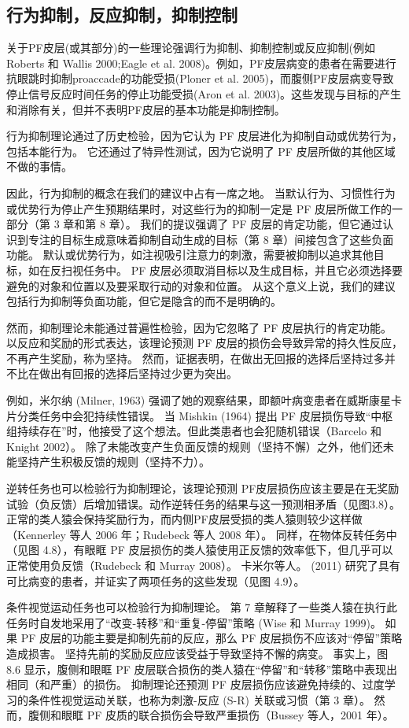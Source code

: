 \subsection{行为抑制，反应抑制，抑制控制}
关于PF皮层(或其部分)的一些理论强调行为抑制、抑制控制或反应抑制(例如Roberts 和 Wallis 2000;Eagle et al. 2008)。例如，PF皮层病变的患者在需要进行抗眼跳时抑制proaccade的功能受损(Ploner et al. 2005)，而腹侧PF皮层病变导致停止信号反应时间任务的停止功能受损(Aron et al. 2003)。这些发现与目标的产生和消除有关，但并不表明PF皮层的基本功能是抑制控制。
\par 
行为抑制理论通过了历史检验，因为它认为 PF 皮层进化为抑制自动或优势行为，包括本能行为。 它还通过了特异性测试，因为它说明了 PF 皮层所做的其他区域不做的事情。
\par 
因此，行为抑制的概念在我们的建议中占有一席之地。 当默认行为、习惯性行为或优势行为停止产生预期结果时，对这些行为的抑制一定是 PF 皮层所做工作的一部分（第 3 章和第 8 章）。 我们的提议强调了 PF 皮层的肯定功能，但它通过认识到专注的目标生成意味着抑制自动生成的目标（第 8 章）间接包含了这些负面功能。 默认或优势行为，如注视吸引注意力的刺激，需要被抑制以追求其他目标，如在反扫视任务中。 PF 皮层必须取消目标以及生成目标，并且它必须选择要避免的对象和位置以及要采取行动的对象和位置。 从这个意义上说，我们的建议包括行为抑制等负面功能，但它是隐含的而不是明确的。
\par 
然而，抑制理论未能通过普遍性检验，因为它忽略了 PF 皮层执行的肯定功能。 以反应和奖励的形式表达，该理论预测 PF 皮层的损伤会导致异常的持久性反应，不再产生奖励，称为坚持。 然而，证据表明，在做出无回报的选择后坚持过多并不比在做出有回报的选择后坚持过少更为突出。
\par 
例如，米尔纳 (Milner, 1963) 强调了她的观察结果，即额叶病变患者在威斯康星卡片分类任务中会犯持续性错误。 当 Mishkin (1964) 提出 PF 皮层损伤导致“中枢组持续存在”时，他接受了这个想法。但此类患者也会犯随机错误（Barcelo 和 Knight 2002）。 除了未能改变产生负面反馈的规则（坚持不懈）之外，他们还未能坚持产生积极反馈的规则（坚持不力）。
\par 
逆转任务也可以检验行为抑制理论，该理论预测 PF皮层损伤应该主要是在无奖励试验（负反馈）后增加错误。动作逆转任务的结果与这一预测相矛盾（见图3.8）。正常的类人猿会保持奖励行为，而内侧PF皮层受损的类人猿则较少这样做（Kennerley 等人 2006 年；Rudebeck 等人 2008 年）。 同样，在物体反转任务中（见图 4.8），有眼眶 PF 皮层损伤的类人猿使用正反馈的效率低下，但几乎可以正常使用负反馈（Rudebeck 和 Murray 2008）。 卡米尔等人。 (2011) 研究了具有可比病变的患者，并证实了两项任务的这些发现（见图 4.9）。
\par 
条件视觉运动任务也可以检验行为抑制理论。 第 7 章解释了一些类人猿在执行此任务时自发地采用了“改变-转移”和“重复-停留”策略 (Wise 和 Murray 1999)。 如果 PF 皮层的功能主要是抑制先前的反应，那么 PF 皮层损伤不应该对“停留”策略造成损害。 坚持先前的奖励反应应该受益于导致坚持不懈的病变。 事实上，图 8.6 显示，腹侧和眼眶 PF 皮层联合损伤的类人猿在“停留”和“转移”策略中表现出相同（和严重）的损伤。 抑制理论还预测 PF 皮层损伤应该避免持续的、过度学习的条件性视觉运动关联，也称为刺激-反应 (S-R) 关联或习惯（第 3 章）。 然而，腹侧和眼眶 PF 皮质的联合损伤会导致严重损伤（Bussey 等人，2001 年）。
